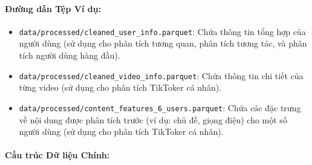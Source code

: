 \paragraph{Đường dẫn Tệp Ví dụ:}
\begin{itemize}
    \item \texttt{data/processed/cleaned\_user\_info.parquet}: Chứa thông tin tổng hợp của người dùng (sử dụng cho phân tích tương quan, phân tích tương tác, và phân tích người dùng hàng đầu).
    
    \item \texttt{data/processed/cleaned\_video\_info.parquet}: Chứa thông tin chi tiết của từng video (sử dụng cho phân tích TikToker cá nhân).
    
    \item \texttt{data/processed/content\_features\_6\_users.parquet}: Chứa các đặc trưng về nội dung được phân tích trước (ví dụ: chủ đề, giọng điệu) cho một số người dùng (sử dụng cho phân tích TikToker cá nhân).
\end{itemize}


\paragraph{Cấu trúc Dữ liệu Chính:}

